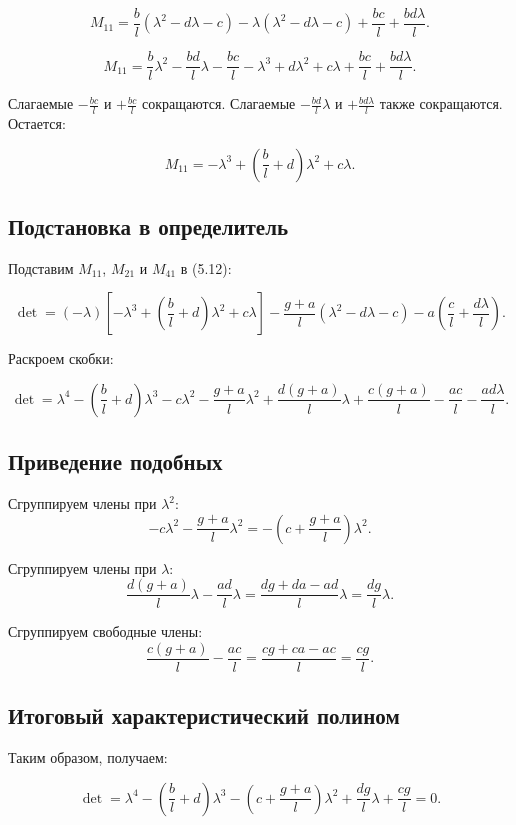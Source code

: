 \documentclass[a4paper, 12pt]{article}
\begin{document}
\[
M_{11} = \frac{b}{l} (\lambda^2 - d\lambda - c) - \lambda (\lambda^2 - d\lambda - c) + \frac{bc}{l} + \frac{bd\lambda}{l}.
\]

\[
M_{11} = \frac{b}{l}\lambda^2 - \frac{bd}{l}\lambda - \frac{bc}{l} - \lambda^3 + d\lambda^2 + c\lambda + \frac{bc}{l} + \frac{bd\lambda}{l}.
\]

Слагаемые $-\frac{bc}{l}$ и $+\frac{bc}{l}$ сокращаются. Слагаемые $-\frac{bd}{l}\lambda$ и $+\frac{bd\lambda}{l}$ также сокращаются. Остается:

\[
M_{11} = -\lambda^3 + \left( \frac{b}{l} + d \right) \lambda^2 + c\lambda.
\]

\subsection{Подстановка в определитель}

Подставим $M_{11}$, $M_{21}$ и $M_{41}$ в (5.12):

\[
\det = (-\lambda) \left[ -\lambda^3 + \left( \frac{b}{l} + d \right) \lambda^2 + c\lambda \right] - \frac{g + a}{l} (\lambda^2 - d\lambda - c) - a \left( \frac{c}{l} + \frac{d\lambda}{l} \right).
\]

Раскроем скобки:

\[
\det = \lambda^4 - \left( \frac{b}{l} + d \right) \lambda^3 - c\lambda^2 - \frac{g + a}{l} \lambda^2 + \frac{d(g + a)}{l} \lambda + \frac{c(g + a)}{l} - \frac{ac}{l} - \frac{ad\lambda}{l}.
\]

\subsection{Приведение подобных}

Сгруппируем члены при $\lambda^2$:
\[
- c\lambda^2 - \frac{g + a}{l} \lambda^2 = -\left( c + \frac{g + a}{l} \right) \lambda^2.
\]

Сгруппируем члены при $\lambda$:
\[
\frac{d(g + a)}{l} \lambda - \frac{ad}{l} \lambda = \frac{dg + da - ad}{l} \lambda = \frac{dg}{l} \lambda.
\]

Сгруппируем свободные члены:
\[
\frac{c(g + a)}{l} - \frac{ac}{l} = \frac{cg + ca - ac}{l} = \frac{cg}{l}.
\]

\subsection{Итоговый характеристический полином}

Таким образом, получаем:

\[
\det = \lambda^4 - \left( \frac{b}{l} + d \right) \lambda^3 - \left( c + \frac{g + a}{l} \right) \lambda^2 + \frac{dg}{l} \lambda + \frac{cg}{l} = 0.
\]
\end{document}
